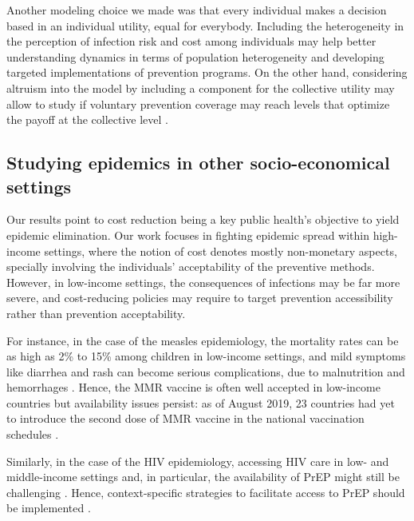 Another modeling choice we made was that every individual makes a decision based in an individual utility, equal for everybody. Including the heterogeneity in the perception of infection risk and cost among individuals may help better understanding dynamics in terms of population heterogeneity and developing targeted implementations of prevention programs. On the other hand, considering altruism into the model by including a component for the collective utility may allow to study if voluntary prevention coverage may reach levels that optimize the payoff at the collective level \cite[]{Shim2012}. 





\subsection{Studying epidemics in other socio-economical settings}
Our results point to cost reduction being a key public health's objective to yield epidemic elimination. Our work focuses in fighting epidemic spread within high-income settings, where the notion of cost denotes mostly non-monetary aspects, specially involving the individuals' acceptability of the preventive methods. However, in low-income settings, the consequences of infections may be far more severe, and cost-reducing policies may require to target prevention accessibility rather than prevention acceptability. 

For instance, in the case of the measles epidemiology, the mortality rates can be as high as 2\% to 15\% among children in low-income settings, and mild symptoms like diarrhea and rash can become serious complications, due to malnutrition and hemorrhages \cite[]{Sever2011}. Hence, the MMR vaccine is often well accepted in low-income countries \cite[]{Larson2016} but availability issues persist: as of August 2019, 23 countries had yet to introduce the second dose of MMR vaccine in the national vaccination schedules \cite[]{WHO_MeaslesWW2019}. 

Similarly, in the case of the HIV epidemiology, accessing HIV care in low- and middle-income settings and, in particular, the availability of PrEP might still be challenging \cite[]{UNAIDS_Data2019}. Hence, context-specific strategies to facilitate access to PrEP should be implemented \cite[]{Rebe2019}. 


